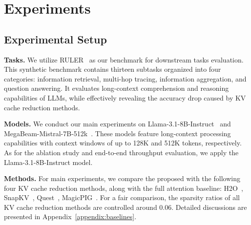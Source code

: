 \section{Experiments}


\subsection{Experimental Setup}

\noindent \textbf{Tasks.} 
We utilize RULER~\citep{ruler} as our benchmark for downstream tasks evaluation.
This synthetic benchmark 
contains thirteen subtasks organized into four categories: information retrieval, multi-hop tracing, information aggregation, and question answering. 
It evaluates long-context comprehension and reasoning capabilities of LLMs, while effectively revealing the accuracy drop caused by KV cache reduction methods.

\noindent \textbf{Models.}
We conduct our main experiments on  
Llama-3.1-8B-Instruct~\citep{llama-3} and MegaBeam-Mistral-7B-512k~\citep{megabeam-mistral}.
These models feature long-context processing capabilities with context windows of up to 128K and 512K tokens, respectively. 
As for the ablation study and end-to-end throughput evaluation, we apply the Llama-3.1-8B-Instruct model.

\noindent \textbf{Methods.}
For main experiments, we compare the proposed {\name} with the following four KV cache reduction methods, along with the full attention baseline: H2O~\citep{h2o}, SnapKV~\citep{snapkv}, Quest~\citep{quest}, MagicPIG~\citep{magicpig}.
For a fair comparison, the sparsity ratios of all KV cache reduction methods are controlled around 0.06.
Detailed discussions are presented in Appendix~\ref{appendix:baselines}.

